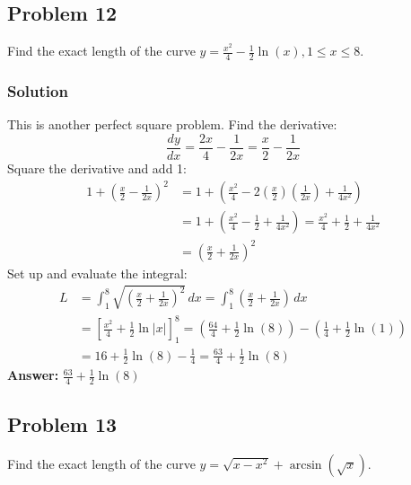 \documentclass{article}
\begin{document}
\subsection{Problem 12}
Find the exact length of the curve $ y = \frac{x^2}{4} - \frac{1}{2}\ln(x), 1 \le x \le 8 $.
\subsubsection*{Solution}
This is another perfect square problem.
Find the derivative:
\[ \frac{dy}{dx} = \frac{2x}{4} - \frac{1}{2x} = \frac{x}{2} - \frac{1}{2x} \]
Square the derivative and add 1:
\begin{align*}
    1 + \left(\frac{x}{2} - \frac{1}{2x}\right)^2 &= 1 + \left(\frac{x^2}{4} - 2\left(\frac{x}{2}\right)\left(\frac{1}{2x}\right) + \frac{1}{4x^2}\right) \\
    &= 1 + \left(\frac{x^2}{4} - \frac{1}{2} + \frac{1}{4x^2}\right) = \frac{x^2}{4} + \frac{1}{2} + \frac{1}{4x^2} \\
    &= \left(\frac{x}{2} + \frac{1}{2x}\right)^2
\end{align*}
Set up and evaluate the integral:
\begin{align*}
    L &= \int_{1}^{8} \sqrt{\left(\frac{x}{2} + \frac{1}{2x}\right)^2} \,dx = \int_{1}^{8} \left(\frac{x}{2} + \frac{1}{2x}\right) \,dx \\
    &= \left[\frac{x^2}{4} + \frac{1}{2}\ln|x|\right]_{1}^{8} = \left(\frac{64}{4} + \frac{1}{2}\ln(8)\right) - \left(\frac{1}{4} + \frac{1}{2}\ln(1)\right) \\
    &= 16 + \frac{1}{2}\ln(8) - \frac{1}{4} = \frac{63}{4} + \frac{1}{2}\ln(8)
\end{align*}
\textbf{Answer:} $ \frac{63}{4} + \frac{1}{2}\ln(8) $

\subsection{Problem 13}
Find the exact length of the curve $ y = \sqrt{x-x^2} + \arcsin(\sqrt{x}) $.
\end{document}

